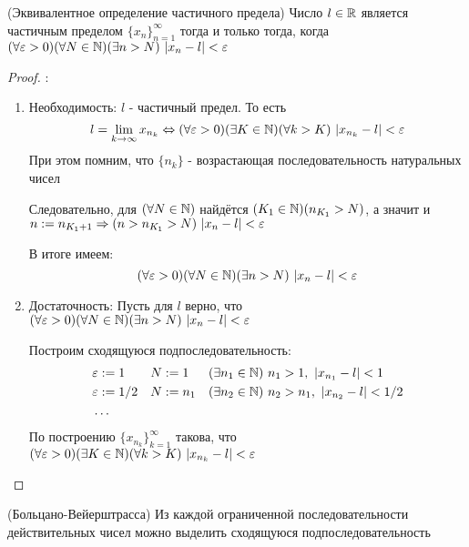 \begin{theorem} (Эквивалентное определение частичного предела)
	Число $l \in \mathbb{R}$ является частичным пределом
	$\{x_n\}_{n = 1}^\infty$ тогда и только тогда, когда
	$(\forall \varepsilon > 0)(\forall N \in \mathbb{N})(\exists n > N)\ |x_n - l| < \varepsilon$
\end{theorem}

\begin{proof}:
\begin{enumerate}
	\item Необходимость: $l$ - частичный предел. То есть 
	\[
		l = \lim\limits_{k \to \infty} x_{n_k} \Leftrightarrow (\forall \varepsilon > 0)
		(\exists K \in \mathbb{N})(\forall k > K)\ |x_{n_k} - l| < \varepsilon
	\]
	При этом помним, что $\{n_k\}$ - возрастающая
	последовательность натуральных чисел
	
	Следовательно, для $(\forall N \in \mathbb{N})$ найдётся
	$(K_1 \in \mathbb{N})(n_{K_1} > N)$, а значит и $n := n_{K_1 + 1}
	\Rightarrow (n > n_{K_1} > N)\ |x_n - l| < \varepsilon$
	
	В итоге имеем:
	\[
		(\forall \varepsilon > 0)(\forall N \in \mathbb{N})(\exists n > N)
		\ |x_n - l| < \varepsilon
	\]
	\item Достаточность: Пусть для $l$ верно, что
	$(\forall \varepsilon > 0)(\forall N \in \mathbb{N})(\exists n > N)
	\ |x_n - l| < \varepsilon$
	
	Построим сходящуюся подпоследовательность:
	\begin{align*}
		&\varepsilon := 1 & &N := 1 & &(\exists n_1 \in \mathbb{N})\ n_1 > 1,\ |x_{n_1} - l| < 1
		\\
		&\varepsilon := 1/2 & &N := n_1 & &(\exists n_2 \in \mathbb{N})\ n_2 > n_1,\ |x_{n_2} - l| < 1/2
		\\
		&\dots
	\end{align*}
	По построению $\{x_{n_k}\}_{k = 1}^\infty$ такова, что
	$(\forall \varepsilon > 0)(\exists K \in \mathbb{N})(\forall k > K)\ |x_{n_k} - l| < \varepsilon$
\end{enumerate}
\end{proof}

\begin{theorem} (Больцано-Вейерштрасса) \label{Bolzano–Weierstrass}
	Из каждой ограниченной последовательности действительных
	чисел можно выделить сходящуюся подпоследовательность
\end{theorem}

